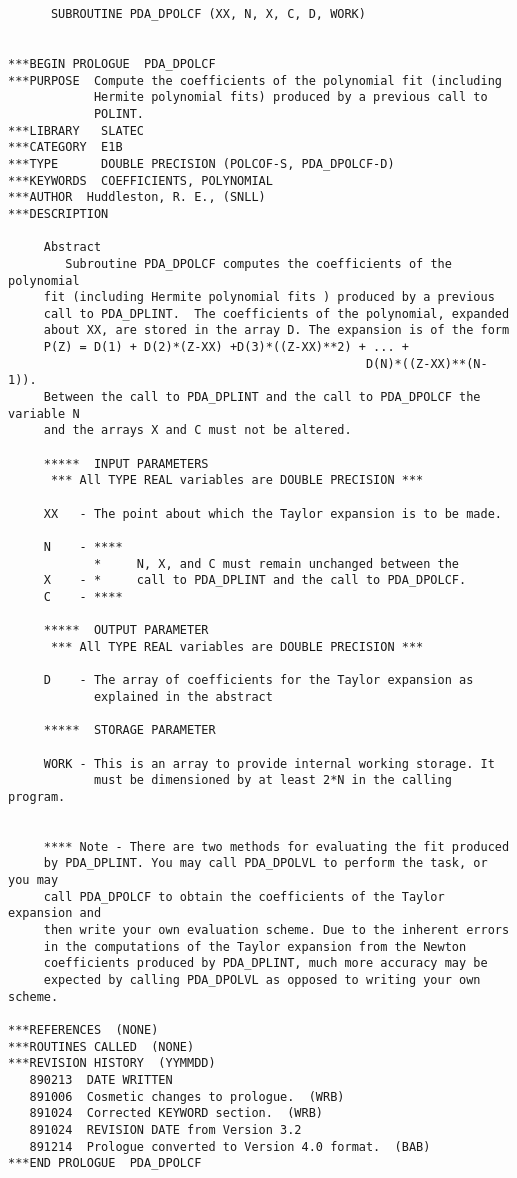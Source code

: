 \begin{verbatim}
      SUBROUTINE PDA_DPOLCF (XX, N, X, C, D, WORK)


***BEGIN PROLOGUE  PDA_DPOLCF
***PURPOSE  Compute the coefficients of the polynomial fit (including
            Hermite polynomial fits) produced by a previous call to
            POLINT.
***LIBRARY   SLATEC
***CATEGORY  E1B
***TYPE      DOUBLE PRECISION (POLCOF-S, PDA_DPOLCF-D)
***KEYWORDS  COEFFICIENTS, POLYNOMIAL
***AUTHOR  Huddleston, R. E., (SNLL)
***DESCRIPTION

     Abstract
        Subroutine PDA_DPOLCF computes the coefficients of the polynomial
     fit (including Hermite polynomial fits ) produced by a previous
     call to PDA_DPLINT.  The coefficients of the polynomial, expanded
     about XX, are stored in the array D. The expansion is of the form
     P(Z) = D(1) + D(2)*(Z-XX) +D(3)*((Z-XX)**2) + ... +
                                                  D(N)*((Z-XX)**(N-1)).
     Between the call to PDA_DPLINT and the call to PDA_DPOLCF the variable N
     and the arrays X and C must not be altered.

     *****  INPUT PARAMETERS
      *** All TYPE REAL variables are DOUBLE PRECISION ***

     XX   - The point about which the Taylor expansion is to be made.

     N    - ****
            *     N, X, and C must remain unchanged between the
     X    - *     call to PDA_DPLINT and the call to PDA_DPOLCF.
     C    - ****

     *****  OUTPUT PARAMETER
      *** All TYPE REAL variables are DOUBLE PRECISION ***

     D    - The array of coefficients for the Taylor expansion as
            explained in the abstract

     *****  STORAGE PARAMETER

     WORK - This is an array to provide internal working storage. It
            must be dimensioned by at least 2*N in the calling program.


     **** Note - There are two methods for evaluating the fit produced
     by PDA_DPLINT. You may call PDA_DPOLVL to perform the task, or you may
     call PDA_DPOLCF to obtain the coefficients of the Taylor expansion and
     then write your own evaluation scheme. Due to the inherent errors
     in the computations of the Taylor expansion from the Newton
     coefficients produced by PDA_DPLINT, much more accuracy may be
     expected by calling PDA_DPOLVL as opposed to writing your own scheme.

***REFERENCES  (NONE)
***ROUTINES CALLED  (NONE)
***REVISION HISTORY  (YYMMDD)
   890213  DATE WRITTEN
   891006  Cosmetic changes to prologue.  (WRB)
   891024  Corrected KEYWORD section.  (WRB)
   891024  REVISION DATE from Version 3.2
   891214  Prologue converted to Version 4.0 format.  (BAB)
***END PROLOGUE  PDA_DPOLCF
\end{verbatim}

